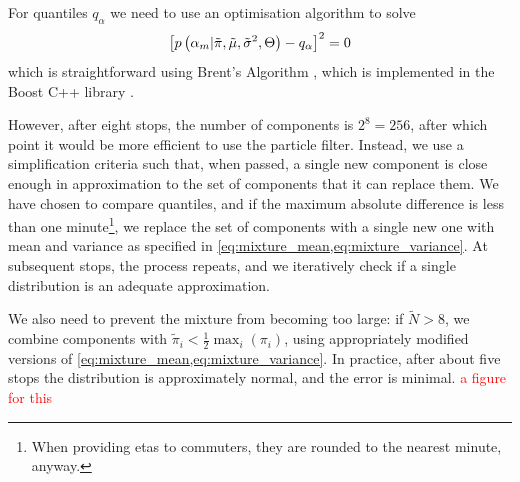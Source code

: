 For quantiles $q_\alpha$ we need to use an optimisation algorithm to solve
\begin{equation}
\label{eq:mixture_quadratic}
\left[
  p\left(\alpha_m | \tilde\pi, \tilde\mu, \tilde\sigma^2, \Theta\right) - q_\alpha
\right]^2 = 0
\end{equation}
which is straightforward using Brent's Algorithm \citep{Brent_1971}, which is implemented in the Boost C++ library \citep{cn}.



However, after eight stops, the number of components is $2^8 = 256$, after which point it would be more efficient to use the particle filter. Instead, we use a simplification criteria such that, when passed, a single new component is close enough in approximation to the set of components that it can replace them. We have chosen to compare quantiles, and if the maximum absolute difference is less than one minute\footnote{When providing \glspl{eta} to commuters, they are rounded to the nearest minute, anyway.}, we replace the set of components with a single new one with mean and variance as specified in \cref{eq:mixture_mean,eq:mixture_variance}. At subsequent stops, the process repeats, and we iteratively check if a single distribution is an adequate approximation.


We also need to prevent the mixture from becoming too large: if $\tilde N > 8$, we combine components with $\tilde\pi_i < \frac{1}{2}\max_i(\pi_i)$, using appropriately modified versions of \cref{eq:mixture_mean,eq:mixture_variance}. In practice, after about five stops the distribution is approximately normal, and the error is minimal. \textcolor{red}{a figure for this}
